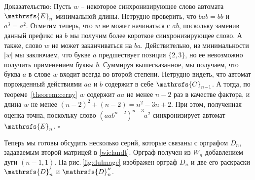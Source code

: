 \documentclass[11pt]{article}
\newenvironment{proof}{Доказательство:}{$\square$}
\begin{document}
\begin{proof}
Пусть $w$ -- некоторое синхронизирующее слово автомата $\mathrsfs{E}_n$ минимальной длины. Нетрудно проверить, 
что $bab = bb$ и $a^3 = a^2$. Отметим теперь, что 
$w$ не может начинаться с $ab$, поскольку заменив данный префикс на $b$ мы получим более короткое
синхронизирующее слово. А также, слово $w$ не может заканчиваться на $ba$. Действительно, из минимальности
$|w|$ мы заключаем, что букве $a$ предшествует позиция $\{2,3\}$, но ее невозможно получить
применением буквы $b$. Суммируя вышесказанное, мы получаем, что	буква $a$ в слове $w$ входит всегда
во второй степени. Нетрудно видеть, что автомат порожденный действиями $aa$ и $b$ содержит в себе $\mathrsfs{C}_{n - 1}$.
А тогда, по теореме~\ref{theorem:cerny} $w$ содержит $aa$ не менее $n - 2$ раз в качестве фактора, и
длина $w$ не менее $(n - 2)^2 + (n - 2) = n^2 - 3n + 2$.
При этом, полученная оценка точна, поскольку слово $(aab^{n - 2})^{n - 3}a^2$ синхронизирует автомат $\mathrsfs{E}_n$.
\end{proof}


Теперь мы готовы обсудить несколько серий, которые связаны с орграфом $D_n$,
задаваемым второй матрицей в \eqref{wielandt}. Орграф получен из $W_n$
добавлением дуги $(n-1,1)$. На рис.\,\ref{fig:dulmage} изображен орграф $D_n$
и две его раскраски $\mathrsfs{D}'_n$ и $\mathrsfs{D}''_n$.


\end{document}
